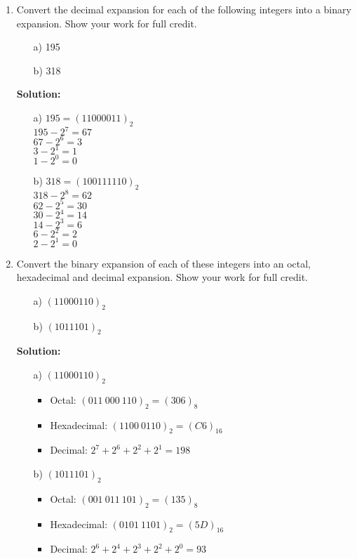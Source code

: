 \documentclass{article}
\newenvironment{solution}
{
\par
\color{blue}
\textbf{Solution:}
}
{
\par
}
\begin{document}
\begin{enumerate}
\item Convert the decimal expansion for each of the following integers into a binary expansion. Show your work for full credit.
\begin{enumerate}
    \item[a)] 195
    \item[b)] 318
\end{enumerate}
    \begin{solution}
    \begin{enumerate}
        \item[a)] $195 = (1100 0011)_2$\\
        $195 - 2^7 = 67$\\
        $67 - 2^6 = 3$\\
        $3 - 2^1 = 1$\\
        $1 - 2^0 = 0$
        \item[b)] $318 = (1 0011 1110)_2$\\
        $318 - 2^8 = 62$\\
        $62 - 2^5 = 30$\\
        $30 - 2^4 = 14$\\
        $14 - 2^3 = 6$\\
        $6 - 2^2 = 2$\\
        $2 - 2^1 = 0$
    \end{enumerate}
    \end{solution}

\item Convert the binary expansion of each of these integers into an octal, hexadecimal and decimal expansion. Show your work for full credit.
\begin{enumerate}
    \item[a)] $(11000110)_2$
    \item[b)] $(1011101)_2$
\end{enumerate}
    \begin{solution}
    \begin{enumerate}
        \item[a)] $(11000110)_2$
        \begin{itemize}
            \item Octal: $(011\:000\:110)_2 = (306)_8$
            \item Hexadecimal: $(1100\:0110)_2 = (C6)_{16}$
            \item Decimal: $2^7 + 2^6 + 2^2 + 2^1 = 198$
        \end{itemize}
        \item[b)] $(1011101)_2$
        \begin{itemize}
            \item Octal: $(001\:011\:101)_2 = (135)_8$
            \item Hexadecimal: $(0101\:1101)_2 = (5D)_{16}$
            \item Decimal: $2^6 + 2^4 + 2^3 + 2^2 + 2^0 = 93$
        \end{itemize}
    \end{enumerate}
    \end{solution}


\end{enumerate}
\end{document}
